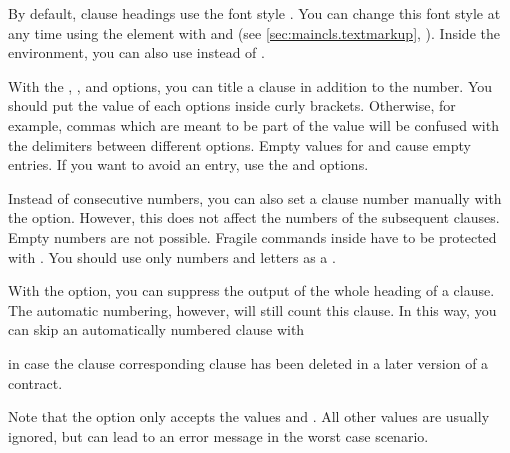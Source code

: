 %
%
By default, clause headings use the font style
. You can change this font style
at any time using the
 element
with %
 and
 (see \autoref{sec:maincls.textmarkup},
). Inside the
 environment, you can also use
 instead of
.%
%

With the , , and  options, you can
title a clause in addition to the number. You should put
the value of each options inside curly brackets. Otherwise, for example,
commas which are meant to be part of the value will be confused with the
delimiters between different options. Empty values for  and
 cause empty entries. If you want to avoid an entry, use the
 and
 options.

Instead of consecutive numbers, you can also set a clause number manually with
the  option. However, this does not
affect the numbers of the subsequent clauses. Empty numbers are not possible.
Fragile commands inside  have to be protected with
. You should use only numbers and letters
as a .

With the  option, you can suppress the
output of the whole heading of a clause. The automatic numbering, however,
will still count this clause. In this way, you can skip an automatically
numbered clause with
\begin{lstcode}
\end{lstcode}
in case the clause corresponding clause has been deleted in a later version of
a contract.

Note that the  option only accepts the
values  and . All other values are usually ignored,
but can lead to an error message in the worst case scenario.%
\EndIndexGroup


